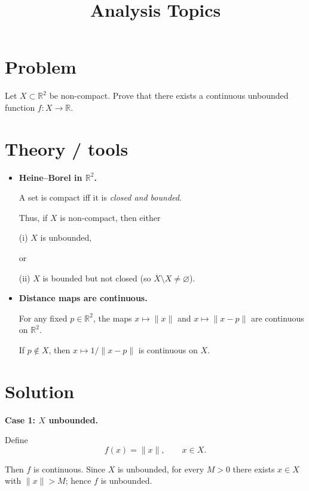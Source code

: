 \documentclass[12pt,a4paper]{article}
\title{\Large Analysis Topics}
\author{}
\date{}
\theoremstyle{plain}
\theoremstyle{definition}
\theoremstyle{remark}
\theoremstyle{remark}
\begin{document}
	\maketitle
	
	
\section*{Problem}

Let \(X\subset \mathbb{R}^2\) be non-compact.
Prove that there exists a continuous unbounded function \(f:X\to\mathbb{R}\).

\bigskip

\section*{Theory / tools}

\begin{itemize}

\item \textbf{Heine--Borel in \(\mathbb{R}^2\).}

A set is compact iff it is \emph{closed and bounded}.

Thus, if \(X\) is non-compact, then either

(i) \(X\) is unbounded,

or

(ii) \(X\) is bounded but not closed (so \(\overline{X}\setminus X\neq\varnothing\)).

\item \textbf{Distance maps are continuous.}

For any fixed \(p\in\mathbb{R}^2\),
the maps \(x\mapsto \|x\|\) and \(x\mapsto \|x-p\|\) are continuous on \(\mathbb{R}^2\).

If \(p\notin X\), then \(x\mapsto 1/\|x-p\|\) is continuous on \(X\).

\end{itemize}

\bigskip

\section*{Solution}

\noindent\textbf{Case 1: \(X\) unbounded.}

Define
\[
f(x)=\|x\|, \qquad x\in X .
\]

Then \(f\) is continuous.
Since \(X\) is unbounded, for every \(M>0\) there exists \(x\in X\) with \(\|x\|>M\);
hence \(f\) is unbounded.
\end{document}
